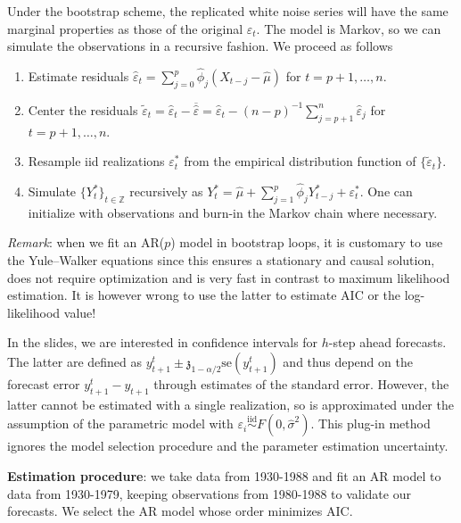 \documentclass[]{book}
\providecommand{\tightlist}{%
  \setlength{\itemsep}{0pt}\setlength{\parskip}{0pt}}
\begin{document}
Under the bootstrap scheme, the replicated white noise series will have
the same marginal properties as those of the original \(\varepsilon_t\).
The model is Markov, so we can simulate the observations in a recursive
fashion. We proceed as follows

\begin{enumerate}
\def\labelenumi{\arabic{enumi}.}
\tightlist
\item
  Estimate residuals
  \(\widehat{\varepsilon}_t = \sum_{j=0}^p \widehat{\phi}_j (X_{t-j}-\widehat{\mu})\)
  for \(t=p+1, \ldots, n\).
\item
  Center the residuals
  \(\widetilde{\varepsilon}_t=\widehat{\varepsilon}_t-\overline{\widehat{\varepsilon}} = \widehat{\varepsilon}_t - (n-p)^{-1} \sum_{j=p+1}^n \widehat{\varepsilon}_j\)
  for \(t=p+1, \ldots, n\).
\item
  Resample iid realizations \(\varepsilon^*_t\) from the empirical
  distribution function of \(\{\widetilde{\varepsilon}_t\}\).
\item
  Simulate \(\{Y_t^*\}_{t\in \mathbb{Z}}\) recursively as
  \(Y_t^*=\widehat{\mu}+\sum_{j=1}^p\widehat{\phi}_jY_{t-j}^*+\varepsilon^*_t\).
  One can initialize with observations and burn-in the Markov chain
  where necessary.
\end{enumerate}

\emph{Remark}: when we fit an AR(\(p\)) model in bootstrap loops, it is
customary to use the Yule--Walker equations since this ensures a
stationary and causal solution, does not require optimization and is
very fast in contrast to maximum likelihood estimation. It is however
wrong to use the latter to estimate AIC or the log-likelihood value!

In the slides, we are interested in confidence intervals for \(h\)-step
ahead forecasts. The latter are defined as
\({y}_{t+1}^t\pm \mathfrak{z}_{1-\alpha/2}\mathrm{se}({y}_{t+1}^t)\) and
thus depend on the forecast error \(y_{t+1}^t-y_{t+1}\) through
estimates of the standard error. However, the latter cannot be estimated
with a single realization, so is approximated under the assumption of
the parametric model with
\(\varepsilon_i \stackrel{\mathrm{iid}}{\sim}F(0,\widehat{\sigma}^2)\).
This plug-in method ignores the model selection procedure and the
parameter estimation uncertainty.

\textbf{Estimation procedure}: we take data from 1930-1988 and fit an AR
model to data from 1930-1979, keeping observations from 1980-1988 to
validate our forecasts. We select the AR model whose order minimizes
AIC.
\end{document}
